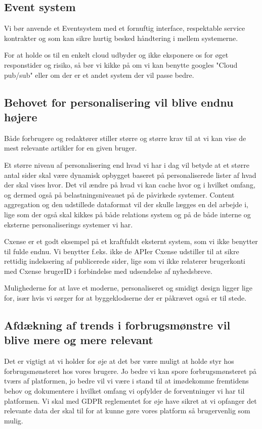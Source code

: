 \documentclass{article}
\begin{document}
\subsection{Event system}
Vi bør anvende et Eventsystem med et fornuftig interface, respektable service kontrakter og som kan sikre hurtig besked håndtering i mellem systemerne.

For at holde os til en enkelt cloud udbyder og ikke eksponere os for øget responstider og risiko, så bør vi kikke på om vi kan benytte googles "Cloud pub/sub" eller om der er et andet system der vil passe bedre.


\subsection{Behovet for personalisering vil blive endnu højere}
Både forbrugere og redaktører stiller større og større krav til at vi kan vise de mest relevante artikler for en given bruger. 

Et større niveau af personalisering end hvad vi har i dag vil betyde at et større antal sider skal være dynamisk opbygget baseret på personaliserede lister af hvad der skal vises hvor. Det vil ændre på hvad vi kan cache hvor og i hvilket omfang, og dermed også på belastningsniveauet på de påvirkede systemer. Content aggregation og den udstillede dataformat vil der skulle lægges en del arbejde i, lige som der også skal kikkes på både relations system og på de både interne og eksterne personaliserings systemer vi har.

Cxense er et godt eksempel på et kraftfuldt eksternt system, som vi ikke benytter til fulde endnu. Vi benytter f.eks. ikke de APIer Cxense  udstiller til at sikre rettidig indeksering af publicerede sider, lige som vi ikke relaterer brugerkonti med Cxense brugerID i forbindelse med udsendelse af nyhedsbreve.

Mulighederne for at lave et moderne, personaliseret og smidigt design ligger lige for, især hvis vi sørger for at byggeklodserne der er påkrævet også er til stede.


\subsection{Afdækning af trends i forbrugsmønstre vil blive mere og mere relevant}
Det er vigtigt at vi holder for øje at det bør være muligt at holde styr hos forbrugsmønsteret hos vores brugere. Jo bedre vi kan spore forbrugsmønsteret på tværs af platformen, jo bedre vil vi være i stand til at imødekomme fremtidens behov og dokumentere i hvilket omfang vi opfylder de forventninger vi har til platformen.
Vi skal med GDPR reglementet for øje have sikret at vi opfanger det relevante data der skal til for at kunne gøre vores platform så brugervenlig som mulig.
\end{document}
